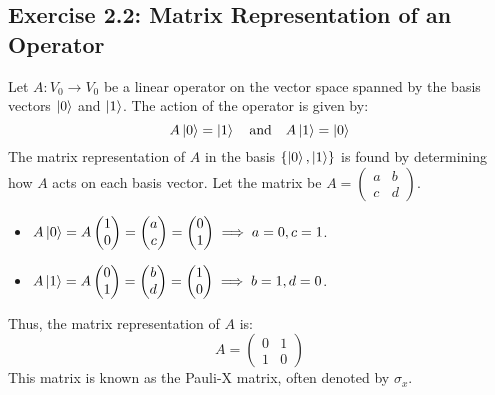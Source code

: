 \documentclass{article}
\begin{document}
\subsection*{Exercise 2.2: Matrix Representation of an Operator}
Let $A: V_0 \to V_0$ be a linear operator on the vector space spanned by the basis vectors $\ket{0}$ and $\ket{1}$. The action of the operator is given by:
$$ A\ket{0} = \ket{1} \quad \text{and} \quad A\ket{1} = \ket{0} $$
The matrix representation of $A$ in the basis $\{\ket{0}, \ket{1}\}$ is found by determining how $A$ acts on each basis vector. Let the matrix be $A = \begin{pmatrix} a & b \\ c & d \end{pmatrix}$.
\begin{itemize}
    \item $A\ket{0} = A \begin{pmatrix} 1 \\ 0 \end{pmatrix} = \begin{pmatrix} a \\ c \end{pmatrix} = \begin{pmatrix} 0 \\ 1 \end{pmatrix} \implies a=0, c=1$.
    \item $A\ket{1} = A \begin{pmatrix} 0 \\ 1 \end{pmatrix} = \begin{pmatrix} b \\ d \end{pmatrix} = \begin{pmatrix} 1 \\ 0 \end{pmatrix} \implies b=1, d=0$.
\end{itemize}
Thus, the matrix representation of $A$ is:
$$ A = \begin{pmatrix} 0 & 1 \\ 1 & 0 \end{pmatrix} $$
This matrix is known as the Pauli-X matrix, often denoted by $\sigma_x$.
\end{document}
